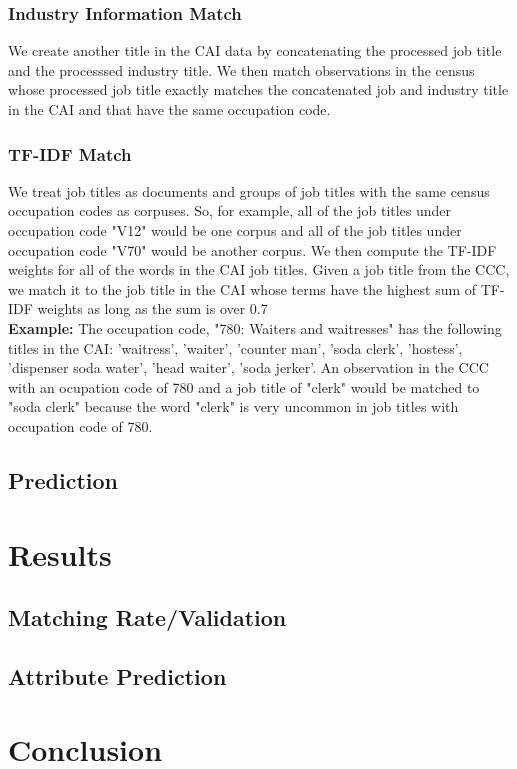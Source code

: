 \documentclass[12pt]{article}
\begin{document}
    \subsubsection{Industry Information Match}
      We create another title in the CAI data by concatenating the processed job title and the processsed industry title. We then match observations in the census whose processed job title exactly matches the concatenated job and industry title in the CAI and that have the same occupation code.

    \subsubsection{TF-IDF Match}
      We treat job titles as documents and groups of job titles with the same census occupation codes as corpuses. So, for example, all of the job titles under occupation code "V12" would be one corpus and all of the job titles under occupation code "V70" would be another corpus. We then compute the TF-IDF weights for all of the words in the CAI job titles. Given a job title from the CCC, we match it to the job title in the CAI whose terms have the highest sum of TF-IDF weights as long as the sum is over 0.7 \\

      \textbf{Example:} The occupation code, "780: Waiters and waitresses" has the following titles in the CAI: 'waitress', 'waiter', 'counter man', 'soda clerk', 'hostess', 'dispenser soda water', 'head waiter', 'soda jerker'. An observation in the CCC with an ocupation code of 780 and a job title of "clerk" would be matched to "soda clerk" because the word "clerk" is very uncommon in job titles with occupation code of 780.

  \subsection{Prediction}

\section{Results}
  \subsection{Matching Rate/Validation}
  \subsection{Attribute Prediction}

\section{Conclusion}
\end{document}
